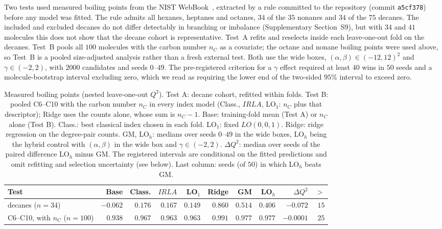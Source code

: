 \documentclass[a5paper, 10pt]{article}
\theoremstyle{plain}
\theoremstyle{remark}
\theoremstyle{definition}
\begin{document}
Two tests used measured boiling points from the NIST
WebBook~\cite{NISTWebBook}, extracted by a rule committed to the
repository (commit \texttt{a5cf378}) before any model was fitted. The rule
admits all hexanes, heptanes and octanes, $34$ of the $35$ nonanes and
$34$ of the $75$ decanes. The included and excluded decanes do not differ
detectably in branching or imbalance (Supplementary Section~S9), but with
$34$ and $41$ molecules this does not show that the decane cohort is
representative. Test~A refits and reselects inside each leave-one-out fold
on the decanes. Test~B pools all $100$ molecules with the carbon number
$n_C$ as a covariate; the octane and nonane boiling points were used
above, so Test~B is a pooled size-adjusted analysis rather than a fresh
external test. Both use the wide boxes, $(\alpha,\beta) \in (-12,12)^2$ and
$\gamma \in (-2,2)$, with $2000$ candidates and seeds $0$--$49$. The
pre-registered criterion for a $\gamma$ effect required at least $40$ wins
in $50$ seeds and a molecule-bootstrap interval excluding zero, which we
read as requiring the lower end of the two-sided $95\%$ interval to exceed
zero.

\begin{table}[htbp]
\centering
\caption{Measured boiling points (nested leave-one-out $Q^2$). Test A:
decane cohort, refitted within folds. Test B: pooled C6--C10 with the carbon number
$n_C$ in every index model (Class., $IRLA$,
LO$_1$: $n_C$ plus that descriptor); Ridge uses the counts alone, whose sum is $n_C - 1$. Base: training-fold mean (Test A)
or $n_C$ alone (Test B).
Class.: best classical index chosen in each fold. LO$_1$: fixed
$LO(0,0,1)$. Ridge: ridge regression on the degree-pair counts. GM,
LO$_h$: medians over seeds $0$--$49$ in the wide boxes, LO$_h$
being the hybrid control with $(\alpha,\beta)$ in the wide box and
$\gamma \in (-2,2)$.
$\Delta Q^2$: median over seeds of the paired difference LO$_h$ minus GM. The registered intervals are conditional on the fitted predictions and omit refitting and selection uncertainty (see below). Last column: seeds (of $50$) in
which LO$_h$ beats GM.}
\label{tab:bp}
\scriptsize
\setlength{\tabcolsep}{1.5pt}
\begin{tabular}{lrrrrrrrrr}
\toprule
Test & Base & Class. & $IRLA$ & LO$_1$ & Ridge & GM & LO$_h$ & $\Delta Q^2$ & $>$\\
\midrule
decanes ($n = 34$) & $-0.062$ & $0.176$ & $0.167$ & $0.149$ & $0.860$ & $0.514$ & $0.406$ & $-0.072$ & $15$\\
C6--C10, with $n_C$ ($n = 100$) & $0.938$ & $0.967$ & $0.963$ & $0.963$ & $0.991$ & $0.977$ & $0.977$ & $-0.0001$ & $25$\\
\bottomrule
\end{tabular}
\end{table}
\end{document}
